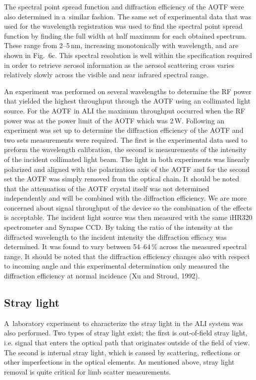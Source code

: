 \documentclass[amtd, online, hvmath]{copernicus}
\begin{document}
The spectral point spread function and diffraction efficiency of the
AOTF were also determined in a~similar fashion. The same set of
experimental data that was used for the wavelength registration was
used to find the spectral point spread function by finding the full
width at half maximum for each obtained spectrum. These range from
2--5\,\unit{nm}, increasing monotonically with wavelength, and are
shown in Fig.~6c. This spectral resolution is well within the
specification required in order to retrieve aerosol information as the
aerosol scattering cross varies relatively slowly across the visible
and near infrared spectral range.

An experiment was performed on several wavelengths to determine the RF power that yielded the highest throughput through the AOTF using an collimated light source. For the AOTF in ALI the maximum throughput occurred when the RF power was at the power limit of the AOTF which was 2\,W. Following an experiment was set up to determine the diffraction efficiency of the AOTF and two sets measurements were required. The first is the experimental data used to preform the wavelength calibration, the second is measurements of the intensity of the incident collimated light beam. The light in both experiments was linearly polarized and aligned with the polarization axis of the AOTF and for the second set the AOTF was simply removed from the optical chain. It should be noted that the attenuation of the AOTF crystal itself was not determined independently and will be combined with the diffraction efficiency. We are more concerned about signal throughput of the device so the combination of the effects is acceptable. The incident light source was then measured with the same iHR320 spectrometer and Synapse CCD. By taking the ratio of the intensity at the diffracted wavelength to the incident intensity the diffraction efficacy was determined. It was found to vary between
54--64\,{\%} across the measured spectral range. It should be noted
that the diffraction efficiency changes also with respect to incoming
angle and this experimental determination only measured the
diffraction efficiency at normal incidence (Xu and Stroud, 1992).

\subsection{Stray light}

A~laboratory experiment to characterize the stray light in the ALI
system was also performed. Two types of stray light exist; the first
is out-of-field stray light, i.e. signal that enters the optical path
that originates outside of the field of view. The second is internal
stray light, which is caused by scattering, reflections or other
imperfections in the optical elements. As mentioned above, stray light
removal is quite critical for limb scatter measurements.
\end{document}
